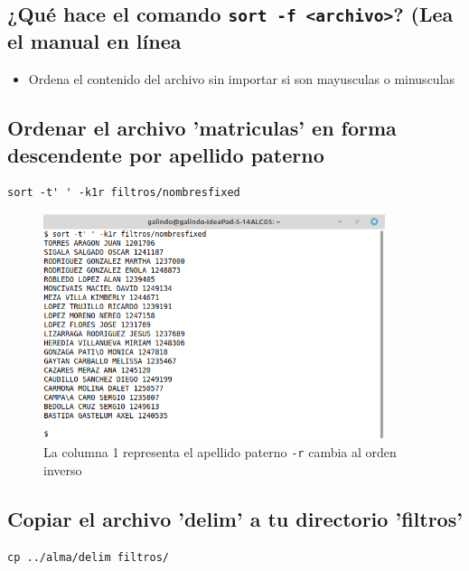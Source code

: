\documentclass[11pt]{article}
\begin{document}
\cite{sort}

\subsection{¿Qué hace el comando \texttt{sort -f <archivo>}? (Lea el manual en línea}
\label{sec:orgaf72dcf}
\begin{mdframed}
\begin{itemize}
\item Ordena el contenido del archivo sin importar si son mayusculas o minusculas
\end{itemize}
\end{mdframed}

\cite{sort}

\subsection{Ordenar el archivo 'matriculas' en forma descendente por apellido paterno}
\label{sec:org7ad40e5}
\begin{verbatim}
sort -t' ' -k1r filtros/nombresfixed
\end{verbatim}

\begin{figure}[htbp]
\centering
\includegraphics[width=10cm]{img/a9.png}
\caption[\texttt{-r}]{La columna 1 representa el apellido paterno \texttt{-r} cambia al orden inverso}
\end{figure}

\subsection{Copiar el archivo 'delim' a tu directorio 'filtros'}
\label{sec:org6cae7f7}
\begin{verbatim}
cp ../alma/delim filtros/
\end{verbatim}
\end{document}
